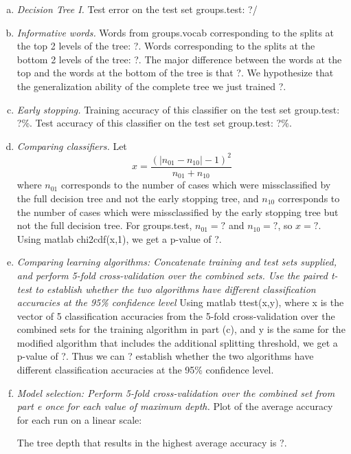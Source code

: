 \documentclass{article}
\begin{document}
\begin{enumerate}[(a)]
\item \emph{Decision Tree I.} Test error on the test set groups.test: ?/%
\item \emph{Informative words.} Words from groups.vocab corresponding to the splits at the top 2 levels of the tree: ?. Words corresponding to the splits at the bottom 2 levels of the tree: ?. The major difference between the words at the top and the words at the bottom of the tree is that ?. We hypothesize that the generalization ability of the complete tree we just trained ?.
\item \emph{Early stopping.} Training accuracy of this classifier on the test set group.test: ?\%. Test accuracy of this classifier on the test set group.test: ?\%. 
\item \emph{Comparing classifiers.} Let \[x=\frac{(|n_{01}-n_{10}|-1)^2}{n_{01}+n_{10}}\]
 where $n_{01}$ corresponds to the number of cases which were missclassified by the full decision tree and not the early stopping tree, and $n_{10}$ corresponds to the number of cases which were missclassified by the early stopping tree but not the full decision tree. For groups.test, $n_{01}=?$ and $n_{10}=?$, so $x=?$. Using matlab chi2cdf(x,1), we get a p-value of ?.
\item \emph{Comparing learning algorithms: Concatenate training and test sets supplied, and perform 5-fold cross-validation over the combined sets. Use the paired t-test to establish whether the two algorithms have different classification accuracies at the 95\% confidence level} Using matlab ttest(x,y), where x is the vector of 5 classification accuracies from the 5-fold cross-validation over the combined sets for the training algorithm in part (c), and y is the same for the modified algorithm that includes the additional splitting threshold, we get a p-value of ?. Thus we can ? establish whether the two algorithms have different classification accuracies at the 95\% confidence level.
\item \emph{Model selection: Perform 5-fold cross-validation over the combined set from part e once for each value of maximum depth.}
Plot of the average accuracy for each run on a linear scale:


The tree depth that results in the highest average accuracy is ?.
\end{enumerate}
\end{document}
